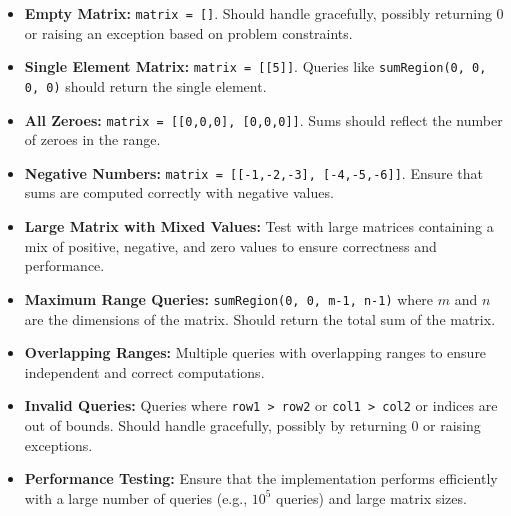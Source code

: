 \begin{itemize}
    \item \textbf{Empty Matrix:} \texttt{matrix = []}. Should handle gracefully, possibly returning 0 or raising an exception based on problem constraints.
    
    \item \textbf{Single Element Matrix:} \texttt{matrix = [[5]]}. Queries like \texttt{sumRegion(0, 0, 0, 0)} should return the single element.
    
    \item \textbf{All Zeroes:} \texttt{matrix = [[0,0,0], [0,0,0]]}. Sums should reflect the number of zeroes in the range.
    
    \item \textbf{Negative Numbers:} \texttt{matrix = [[-1,-2,-3], [-4,-5,-6]]}. Ensure that sums are computed correctly with negative values.
    
    \item \textbf{Large Matrix with Mixed Values:} Test with large matrices containing a mix of positive, negative, and zero values to ensure correctness and performance.
    
    \item \textbf{Maximum Range Queries:} \texttt{sumRegion(0, 0, m-1, n-1)} where \( m \) and \( n \) are the dimensions of the matrix. Should return the total sum of the matrix.
    
    \item \textbf{Overlapping Ranges:} Multiple queries with overlapping ranges to ensure independent and correct computations.
    
    \item \textbf{Invalid Queries:} Queries where \texttt{row1 > row2} or \texttt{col1 > col2} or indices are out of bounds. Should handle gracefully, possibly by returning 0 or raising exceptions.
    
    \item \textbf{Performance Testing:} Ensure that the implementation performs efficiently with a large number of queries (e.g., \( 10^5 \) queries) and large matrix sizes.
\end{itemize}

\printindex